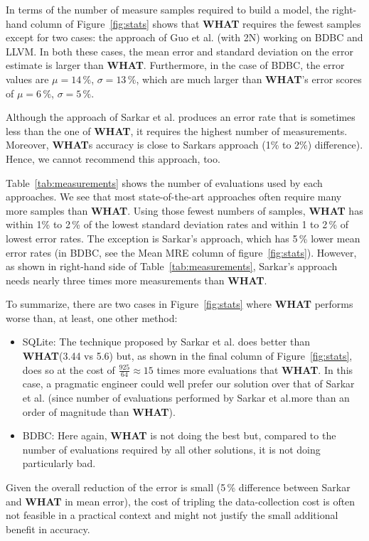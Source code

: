 \documentclass[smallextended]{svjour3}       %
\newcommand{\what}{{\bf WHAT}\xspace}
\begin{document}
In terms of the number of measure samples required to build a model, the right-hand column of Figure~\ref{fig:stats} shows that \what requires the fewest samples except for two cases: the approach of Guo et al. (with 2N) working on BDBC and LLVM. In both these cases, the mean error and standard deviation on the error estimate is larger than \what. Furthermore, in the case of BDBC, the error values
 are $\mu=14\,\%$, $\sigma=13\,\%$, which are much larger
than \what{}'s error scores of $\mu=6\,\%$, $\sigma=5\,\%$. 

Although the approach of Sarkar et al. produces an error rate that is sometimes less than the one of \what, it requires the highest number of measurements. Moreover, \what\textquotesingle s   accuracy is close to Sarkar\textquotesingle s approach (1\% to 2\%) difference). Hence, we cannot recommend this approach, too.

Table~\ref{tab:measurements} shows the number of evaluations used by each approaches. We see that most state-of-the-art approaches often require many more samples than
\what{}.  Using those fewest numbers of samples, \what has
within 1\% to 2\,\% of the lowest standard deviation rates 
and within 1 to 2\,\% of lowest error rates.
The exception is Sarkar's approach, which has 5\,\% lower mean error
rates (in BDBC, see the Mean MRE column of figure~\ref{fig:stats}).  However, 
as shown in right-hand side of Table~\ref{tab:measurements}, Sarkar's approach needs nearly three times
more measurements than \what. 

\noindent To summarize, there are two cases in Figure~\ref{fig:stats} where \what performs worse than, at least, one
other method:
\begin{itemize}
\item 
SQLite: The technique proposed by Sarkar et al. does better than \what (3.44 vs 5.6)
but, as shown in the final column of Figure~\ref{fig:stats},
does so at the cost of $\frac{925}{64} \approx 15$ times more evaluations that \what.
In this case, a pragmatic engineer could well prefer our solution over that of Sarkar et al. (since
number of evaluations performed by Sarkar et al.more than an order of magnitude than \what).
\item BDBC: Here again, \what is not doing the best but, compared to the number of evaluations required by all other solutions, it  is not doing particularly bad.
\end{itemize}


\noindent Given
the overall reduction of the error is   small (5\,\% difference
between Sarkar and \what in mean error), the 
cost of tripling the data-collection cost is
often not feasible in a practical context and might not justify the small additional benefit in accuracy. 
\end{document}

